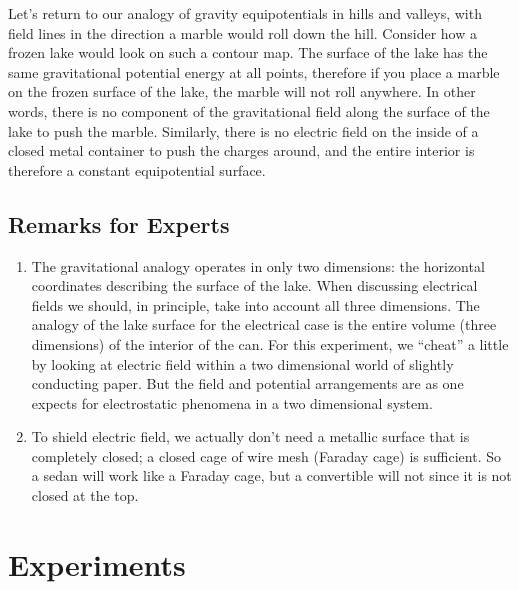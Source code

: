 Let's return to our analogy of gravity equipotentials in hills and valleys, with field lines in the direction a marble would roll down the hill. Consider how a frozen lake would look on such a contour map. The surface of the lake has the same gravitational potential energy at all points, therefore if you place a marble on the frozen surface of the lake, the marble will not roll anywhere. In other words, there is no component of the gravitational field along the surface of the lake to push the marble. Similarly, there is no electric field on the inside of a closed metal container to push the charges around, and the entire interior is therefore a constant equipotential surface.

\subsection{Remarks for Experts}

\begin{enumerate}
    \item  The gravitational analogy operates in only two dimensions: the horizontal coordinates describing the surface of the lake. When discussing electrical fields we should, in principle, take into account all three dimensions. The analogy of the lake surface for the electrical case is the entire volume (three dimensions) of the interior of the can. For this experiment, we ``cheat'' a little by looking at electric field within a two dimensional world of slightly conducting paper. But the field and potential arrangements are as one expects for electrostatic phenomena in a two dimensional system.
    \item To shield electric field, we actually don't need a metallic surface that is completely closed; a closed cage of wire mesh (Faraday cage) is sufficient. So a sedan will work like a Faraday cage, but a convertible will not since it is not closed at the top.
\end{enumerate}

\section{Experiments}

